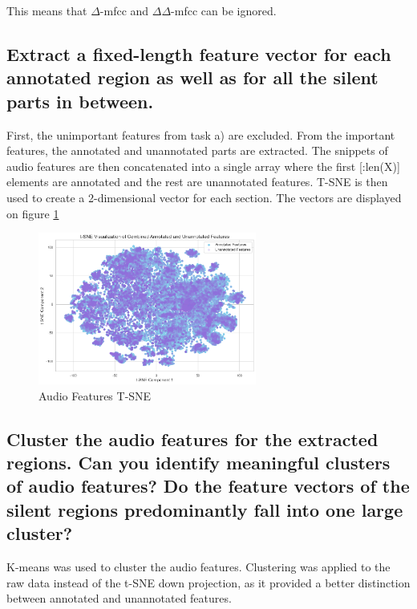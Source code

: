 This means that $\Delta$-mfcc and $\Delta\Delta$-mfcc can be ignored.

\subsection{Extract a fixed-length feature vector for each annotated region as well as for all the silent parts in between. }
\label{sec:Audio Features:b}

First, the unimportant features from task a) are excluded. From the important features, the annotated and unannotated parts are extracted.
The snippets of audio features are then concatenated into a single array where the first [:len(X)] elements are annotated and the rest are unannotated features. T-SNE is then used to create a 2-dimensional vector for each section. The vectors are displayed on figure \ref{fig:Audio Features T-SNE} 


\begin{figure}[htbp]
    \centering
    \includegraphics[width=0.5\linewidth, height=5cm]{figs/Audio Features T-SNE.png}
    \caption{Audio Features T-SNE}
    \label{fig:Audio Features T-SNE}
\end{figure}


\subsection{Cluster the audio features for the extracted regions. Can you identify meaningful clusters of audio features? Do the feature vectors of the silent regions predominantly fall into one large cluster?}
\label{sec:Audio Features:c}

K-means was used to cluster the audio features. Clustering was applied to the raw data instead of the t-SNE down projection, as it provided a better distinction between annotated and unannotated features.


